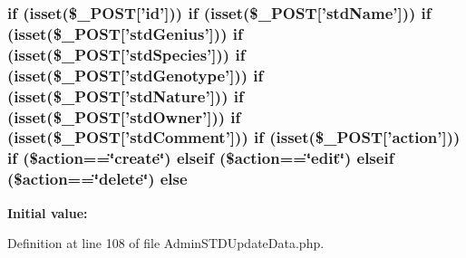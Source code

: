 \hypertarget{_admin_s_t_d_update_data_8php_ac39ffa0dfdb937b45fe1b6df63ed5191}{
\subsubsection[{else}]{\setlength{\rightskip}{0pt plus 5cm}if (isset(\$\-\_\-\-P\-O\-S\-T\mbox{[}'id'\mbox{]})) if (isset(\$\-\_\-\-P\-O\-S\-T\mbox{[}'std\-Name'\mbox{]})) if (isset(\$\-\_\-\-P\-O\-S\-T\mbox{[}'std\-Genius'\mbox{]})) if (isset(\$\-\_\-\-P\-O\-S\-T\mbox{[}'std\-Species'\mbox{]})) if (isset(\$\-\_\-\-P\-O\-S\-T\mbox{[}'std\-Genotype'\mbox{]})) if (isset(\$\-\_\-\-P\-O\-S\-T\mbox{[}'std\-Nature'\mbox{]})) if (isset(\$\-\_\-\-P\-O\-S\-T\mbox{[}'std\-Owner'\mbox{]})) if (isset(\$\-\_\-\-P\-O\-S\-T\mbox{[}'std\-Comment'\mbox{]})) if (isset(\$\-\_\-\-P\-O\-S\-T\mbox{[}'action'\mbox{]})) if (\$action==\char`\"{}create\char`\"{}) elseif (\$action==\char`\"{}edit\char`\"{}) elseif (\$action==\char`\"{}delete\char`\"{}) else}}\label{_admin_s_t_d_update_data_8php_ac39ffa0dfdb937b45fe1b6df63ed5191}
{\bfseries Initial value\-:}


Definition at line 108 of file Admin\-S\-T\-D\-Update\-Data.\-php.

